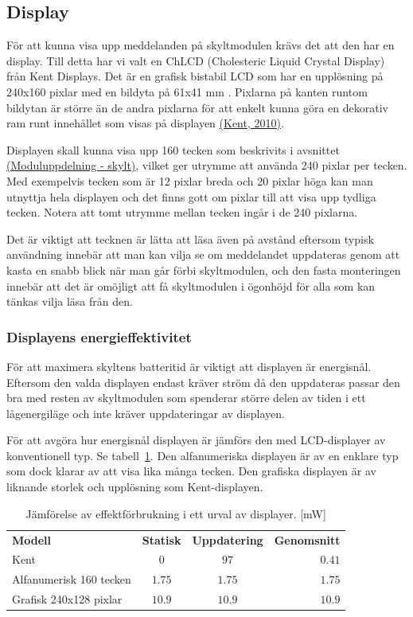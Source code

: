 \documentclass[a4paper,11pt]{article}
\begin{document}
\subsection{Display}
För att kunna visa upp meddelanden på skyltmodulen krävs det att den har en display. Till detta har vi valt en ChLCD (Cholesteric Liquid Crystal Display) från Kent Displays. Det är en grafisk bistabil LCD som har en upplösning på 240x160 pixlar med en bildyta på 61x41 mm . Pixlarna på kanten runtom bildytan är större än de andra pixlarna för att enkelt kunna göra en dekorativ ram runt innehållet som visas på displayen \hyperref[kent]{(Kent, 2010)}.

Displayen skall kunna visa upp 160 tecken som beskrivits i avsnittet \hyperref[skylt]{(Moduluppdelning - skylt)}, vilket ger utrymme att använda 240 pixlar per tecken. Med exempelvis tecken som är 12 pixlar breda och 20 pixlar höga kan man utnyttja hela displayen och det finns gott om pixlar till att visa upp tydliga tecken. Notera att tomt utrymme mellan tecken ingår i de 240 pixlarna.

Det är viktigt att tecknen är lätta att läsa även på avstånd eftersom typisk användning innebär att man kan vilja se om meddelandet uppdateras genom att kasta en snabb blick när man går förbi skyltmodulen, och den fasta monteringen innebär att det är omöjligt att få skyltmodulen i ögonhöjd för alla som kan tänkas vilja läsa från den.

\subsubsection{Displayens energieffektivitet}
För att maximera skyltens batteritid är viktigt att displayen är energisnål. Eftersom den valda displayen endast kräver ström då den uppdateras passar den bra med resten av skyltmodulen som spenderar större delen av tiden i ett lågenergiläge och inte kräver uppdateringar av displayen.

För att avgöra hur energisnål displayen är jämförs den med LCD-displayer av konventionell typ. Se tabell~\ref{tab:kenttable}. Den alfanumeriska displayen är av en enklare typ som dock klarar av att visa lika många tecken. Den grafiska displayen är av liknande storlek och upplösning som Kent-displayen.

\begin{table}[h]
\centering
    \begin{tabular}{|l|c|c|r|}
    {\bf Modell} & {\bf Statisk} & {\bf Uppdatering} & {\bf Genomsnitt} \\
    Kent & $0$ & $97$ & $0.41$ \\
    Alfanumerisk 160 tecken & $1.75$ & $1.75$ & $1.75$ \\
    Grafisk 240x128 pixlar & $10.9$ & $10.9$ & $10.9$ \\
    \end{tabular}
\caption{Jämförelse av effektförbrukning i ett urval av displayer. [mW]}
\label{tab:kenttable}
\end{table}
\end{document}
